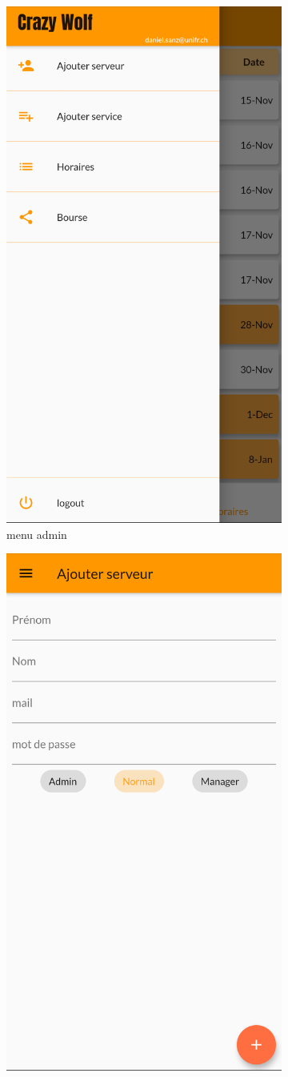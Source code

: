     \begin{figure}[!h]
        \centering
        \begin{subfigure}{.45\textwidth}
            \centering
            \includegraphics[width=0.6\linewidth]{screenshots/scenario_06/menu_admin.png}
            \caption{menu admin}
            \label{fig:menu_admin}
        \end{subfigure}
        \begin{subfigure}{.45\textwidth}
            \centering
            \includegraphics[width=0.6\linewidth]{screenshots/scenario_06/ajout_serveur.png}

\end{subfigure}
\end{figure}
